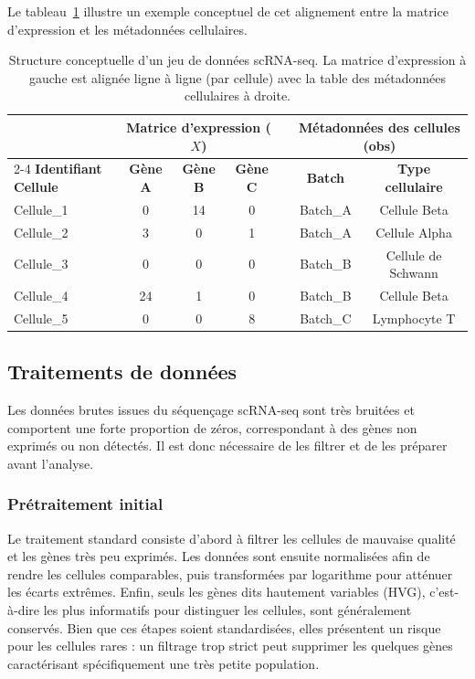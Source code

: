 Le tableau~\ref{tab:sc_dataset_layout} illustre un exemple conceptuel de cet alignement entre la matrice d'expression et les métadonnées cellulaires.

\begin{table}[htbp]
\centering
\renewcommand{\arraystretch}{1.2}
\begin{tabular}{l ccc c cc}
\toprule
& \multicolumn{3}{c}{\textbf{Matrice d'expression ($X$)}} & \phantom{a} & \multicolumn{2}{c}{\textbf{Métadonnées des cellules (obs)}} \\
\cmidrule{2-4} \cmidrule{6-7}
\textbf{Identifiant Cellule} & \textbf{Gène A} & \textbf{Gène B} & \textbf{Gène C} & & \textbf{Batch} & \textbf{Type cellulaire} \\
\midrule
Cellule\_1 & 0  & 14 & 0  & & Batch\_A  & Cellule Beta \\
Cellule\_2 & 3  & 0  & 1  & & Batch\_A  & Cellule Alpha \\
Cellule\_3 & 0  & 0  & 0  & & Batch\_B  & Cellule de Schwann \\
Cellule\_4 & 24 & 1  & 0  & & Batch\_B  & Cellule Beta \\
Cellule\_5 & 0  & 0  & 8  & & Batch\_C  & Lymphocyte T \\
\bottomrule
\end{tabular}
\caption[Structure conceptuelle d'un jeu de données scRNA-seq.]{Structure conceptuelle d'un jeu de données scRNA-seq. La matrice d'expression à gauche est alignée ligne à ligne (par cellule) avec la table des métadonnées cellulaires à droite.}
\label{tab:sc_dataset_layout}
\end{table}

\subsection{Traitements de données}

Les données brutes issues du séquençage scRNA-seq sont très bruitées et comportent une forte proportion de zéros, correspondant à des gènes non exprimés ou non détectés. Il est donc nécessaire de les filtrer et de les préparer avant l'analyse.

\subsubsection{Prétraitement initial}
Le traitement standard \cite{luecken2019current} consiste d'abord à filtrer les cellules de mauvaise qualité et les gènes très peu exprimés. Les données sont ensuite normalisées afin de rendre les cellules comparables, puis transformées par logarithme pour atténuer les écarts extrêmes. Enfin, seuls les gènes dits hautement variables (HVG), c'est-à-dire les plus informatifs pour distinguer les cellules, sont généralement conservés.
Bien que ces étapes soient standardisées, elles présentent un risque pour les cellules rares : un filtrage trop strict peut supprimer les quelques gènes caractérisant spécifiquement une très petite population.

